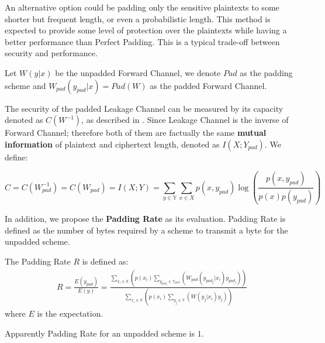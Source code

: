 An alternative option could be padding only the sensitive plaintexts to some shorter but frequent length, or even a probabilistic length. This method is expected to provide some level of protection over the plaintexts while having a better performance than Perfect Padding. This is a typical trade-off between security and performance.
\begin{definition}
Let $W(y|x)$ be the unpadded Forward Channel, we denote $Pad$ as the padding scheme and $W_{pad}(y_{pad}|x) = Pad(W)$ as the padded Forward Channel.
\end{definition}

The security of the padded Leakage Channel can be measured by its capacity denoted as $C(W^{-1})$, as described in \cite{Web2}. Since Leakage Channel is the inverse of Forward Channel; therefore both of them are factually the same \textbf{mutual information} of plaintext and ciphertext length, denoted as $I(X;Y_{pad})$. We define:
\begin{definition}
\begin{equation}
C=C(W_{pad}^{-1})=C(W_{pad})=I(X;Y)=\sum\limits_{y \in \mathbb{Y}}{\sum\limits_{x \in X}{p(x,y_{pad}) \log(\frac{p(x,y_{pad})}{p(x)p(y_{pad})})}}
\end{equation}
\end{definition}

In addition, we propose the \textbf{Padding Rate} as its evaluation. Padding Rate is defined as the number of bytes required by a scheme to transmit a byte for the unpadded scheme. 
\begin{definition}
The Padding Rate $R$ is defined as:
\begin{equation}
\begin{aligned}
R=\frac{E(y_{pad})}{E(y)}=
\frac
{
\sum\limits_
	{
		x_i \in \mathbb{X}
	}
	{(
		p(x_i)
		\sum\limits_
		{
			y_{pad_j} \in \mathbb{Y}_{pad}
		}
		{(
			W_{pad}(y_{pad_j}|x_i)y_{pad_j}
		)}
	)}
}
{
\sum\limits_
	{
		x_i \in \mathbb{X}
	}
	{(
		p(x_i)
		\sum\limits_
		{
			y_j \in \mathbb{Y}
		}
		{(
			W(y_j|x_i)y_j
		)}
	)}
}
\end{aligned}
\end{equation}
where $E$ is the expectation.
\end{definition}
Apparently Padding Rate for an unpadded scheme is $1$.
